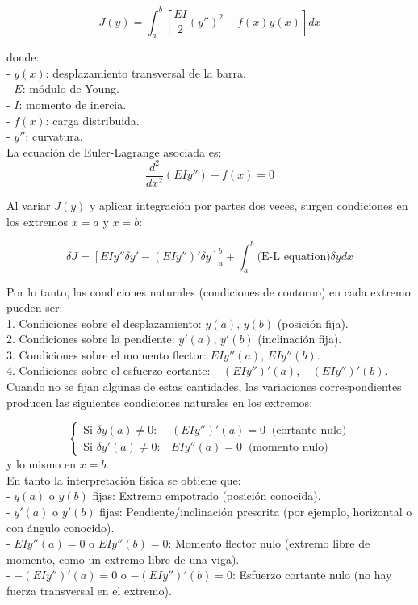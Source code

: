 \documentclass{article}
\theoremstyle{nonumberplain}
\begin{document}
\[
J(y) = \int_a^b \left[ \frac{EI}{2} (y'')^2 - f(x)y(x) \right] dx
\]

donde: \\
- \(y(x)\): desplazamiento transversal de la barra. \\
- \(E\): módulo de Young. \\
- \(I\): momento de inercia. \\
- \(f(x)\): carga distribuida. \\
- \(y''\): curvatura. \\

La ecuación de Euler-Lagrange asociada es:
\[
\frac{d^2}{dx^2} \left( EI y'' \right) + f(x) = 0
\]

Al variar \(J(y)\) y aplicar integración por partes dos veces, surgen condiciones en los extremos \(x=a\) y \(x=b\):

\[
\delta J = \left[ EI y'' \delta y' - (EI y'')' \delta y \right]_a^b + \int_a^b \text{(E-L equation)} \delta y dx
\]

Por lo tanto, las condiciones naturales (condiciones de contorno) en cada extremo pueden ser: \\

1. Condiciones sobre el desplazamiento: \(y(a)\), \(y(b)\) (posición fija). \\
2. Condiciones sobre la pendiente: \(y'(a)\), \(y'(b)\) (inclinación fija). \\
3. Condiciones sobre el momento flector: \(EI y''(a)\), \(EI y''(b)\). \\
4. Condiciones sobre el esfuerzo cortante: \(- (EI y'')'(a)\), \(- (EI y'')'(b)\). \\

Cuando no se fijan algunas de estas cantidades, las variaciones correspondientes producen las siguientes condiciones naturales en los extremos:

\[
\begin{cases}
\text{Si } \delta y(a) \neq 0: & (EI y'')'(a) = 0 \;\; \text{(cortante nulo)} \\
\text{Si } \delta y'(a) \neq 0: & EI y''(a) = 0 \;\; \text{(momento nulo)}
\end{cases}
\]
y lo mismo en \(x=b\). \\

En tanto la interpretación física se obtiene que: \\

- \(y(a)\) o \(y(b)\) fijas: Extremo empotrado (posición conocida). \\
- \(y'(a)\) o \(y'(b)\) fijas: Pendiente/inclinación prescrita (por ejemplo, horizontal o con ángulo conocido). \\
- \(EI y''(a) = 0\) o \(EI y''(b) = 0\): Momento flector nulo (extremo libre de momento, como un extremo libre de una viga). \\
- \(-(EI y'')'(a) = 0\) o \(-(EI y'')'(b) = 0\): Esfuerzo cortante nulo (no hay fuerza transversal en el extremo). \\
\end{document}
